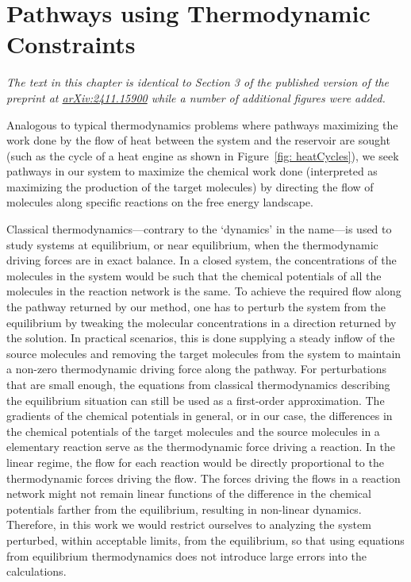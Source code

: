 \chapter[A Constraint-based Model]{Pathways using Thermodynamic Constraints}
\label{ch:thermodynamic_model}

{\sffamily\slshape The text in this chapter is identical to Section 3 of the published version of the preprint at \href{https://arxiv.org/abs/2411.15900}{arXiv:2411.15900} while a number of additional figures were added.\\}

Analogous to typical thermodynamics problems where pathways maximizing the work done by the flow of heat between the system and the reservoir are sought (such as the cycle of a heat engine as shown in Figure~\ref{fig: heatCycles}),
we seek pathways in our system to maximize the chemical work done (interpreted as maximizing the production of the target molecules) by directing the flow of molecules along specific reactions on the free energy landscape.

Classical thermodynamics---contrary to the `dynamics' in the name---is used to study systems at equilibrium,
or near equilibrium, when the thermodynamic driving forces are in exact balance.
In a closed system, the concentrations of the molecules in the system would be such that the chemical potentials of all the molecules in the reaction network is the same.
To achieve the required flow along the pathway returned by our method,
one has to perturb the system from the equilibrium by tweaking the molecular concentrations in a direction returned by the solution.
In practical scenarios, this is done supplying a steady inflow of the source molecules and removing the target molecules from the system to maintain a non-zero thermodynamic driving force along the pathway.  
For perturbations that are small enough, the equations from classical thermodynamics describing the equilibrium situation can still be used as a first-order approximation.
The gradients of the chemical potentials in general, or in our case, the differences in the chemical potentials of the target molecules and the source molecules in a elementary reaction serve as the thermodynamic force driving a reaction.
In the linear regime, the flow for each reaction would be directly proportional to the thermodynamic forces driving the flow.
The forces driving the flows in a reaction network might not remain linear functions of the difference in the chemical potentials farther from the equilibrium, resulting in non-linear dynamics.
Therefore, in this work we would restrict ourselves to analyzing the system perturbed, within acceptable limits,
from the equilibrium, so that using equations from equilibrium thermodynamics does not introduce large errors into the calculations.
\newpage


